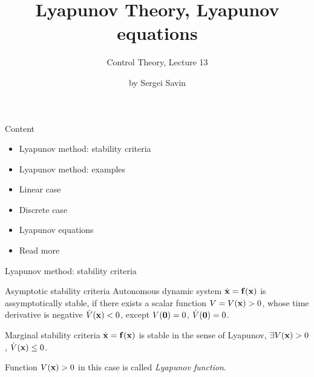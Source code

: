 \documentclass{beamer}
\title{Lyapunov Theory, Lyapunov equations}
\subtitle{Control Theory, Lecture 13}
\author{by Sergei Savin}
\date{\mydate}
\begin{document}
\maketitle


\begin{frame}{Content}

\begin{itemize}
\item Lyapunov method: stability criteria
\item Lyapunov method: examples
\item Linear case
\item Discrete case
\item Lyapunov equations
\item Read more
\end{itemize}

\end{frame}





\begin{frame}{Lyapunov method: stability criteria}
\begin{flushleft}

\begin{block}{Asymptotic stability criteria}
Autonomous dynamic system $\dot{\mathbf{x}} = \mathbf{f}(\mathbf{x})$ is assymptotically stable, if there exists a scalar function $V = V(\mathbf{x}) > 0$, whose time derivative is negative $\dot V(\mathbf{x}) < 0$, except $V(\mathbf{0}) = 0$, $\dot V(\mathbf{0}) = 0$.
\end{block}

\begin{block}{Marginal stability criteria}
$\dot{\mathbf{x}} = \mathbf{f}(\mathbf{x})$ is stable in the sense of Lyapunov, $\exists V(\mathbf{x}) > 0$, $\dot V(\mathbf{x}) \leq 0$.
\end{block}

\begin{definition}
Function $V(\mathbf{x}) > 0$ in this case is called \emph{Lyapunov function}.
\end{definition}


\end{flushleft}
\end{frame}
\end{document}

